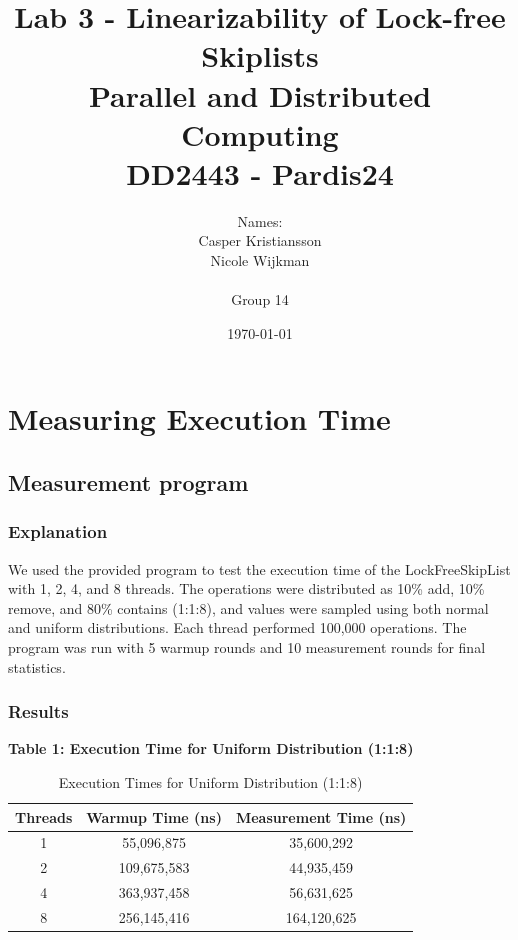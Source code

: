 \documentclass{article}
\title{\textbf{Lab 3 - Linearizability of Lock-free Skiplists\\Parallel and Distributed Computing\\DD2443 - Pardis24}}
\author{Names:\\Casper Kristiansson\\Nicole Wijkman\\\\Group 14}
\date{\today}
\begin{document}
\setlength\parindent{0pt}
\setlength{\parskip}{\bigskipamount}

\maketitle

\newpage
\section{Measuring Execution Time}

\subsection{Measurement program}

\subsubsection{Explanation}
We used the provided program to test the execution time of the LockFreeSkipList with 1, 2, 4, and 8 threads. The operations were distributed as 10\% add, 10\% remove, and 80\% contains (1:1:8), and values were sampled using both normal and uniform distributions. Each thread performed 100,000 operations. The program was run with 5 warmup rounds and 10 measurement rounds for final statistics.

\subsubsection{Results}



\textbf{Table 1: Execution Time for Uniform Distribution (1:1:8)}

\begin{table}[H]
    \centering
    \begin{tabular}{|c|c|c|}
    \hline
    \textbf{Threads} & \textbf{Warmup Time (ns)} & \textbf{Measurement Time (ns)} \\ \hline
    1 & 55,096,875 & 35,600,292 \\ 
    2 & 109,675,583 & 44,935,459 \\
    4 & 363,937,458 & 56,631,625 \\
    8 & 256,145,416 & 164,120,625 \\
    \hline
    \end{tabular}
    \caption{Execution Times for Uniform Distribution (1:1:8)}
\end{table}
\end{document}
